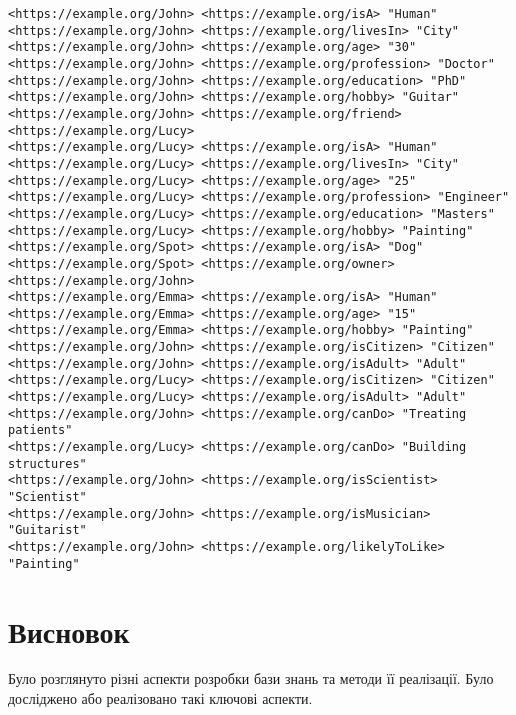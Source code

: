 \documentclass[12pt, a4paper]{article}
\begin{document}
\begin{lstlisting}[breaklines=true]
<https://example.org/John> <https://example.org/isA> "Human"
<https://example.org/John> <https://example.org/livesIn> "City"
<https://example.org/John> <https://example.org/age> "30"
<https://example.org/John> <https://example.org/profession> "Doctor"
<https://example.org/John> <https://example.org/education> "PhD"
<https://example.org/John> <https://example.org/hobby> "Guitar"
<https://example.org/John> <https://example.org/friend> <https://example.org/Lucy>
<https://example.org/Lucy> <https://example.org/isA> "Human"
<https://example.org/Lucy> <https://example.org/livesIn> "City"
<https://example.org/Lucy> <https://example.org/age> "25"
<https://example.org/Lucy> <https://example.org/profession> "Engineer"
<https://example.org/Lucy> <https://example.org/education> "Masters"
<https://example.org/Lucy> <https://example.org/hobby> "Painting"
<https://example.org/Spot> <https://example.org/isA> "Dog"
<https://example.org/Spot> <https://example.org/owner> <https://example.org/John>
<https://example.org/Emma> <https://example.org/isA> "Human"
<https://example.org/Emma> <https://example.org/age> "15"
<https://example.org/Emma> <https://example.org/hobby> "Painting"
<https://example.org/John> <https://example.org/isCitizen> "Citizen"
<https://example.org/John> <https://example.org/isAdult> "Adult"
<https://example.org/Lucy> <https://example.org/isCitizen> "Citizen"
<https://example.org/Lucy> <https://example.org/isAdult> "Adult"
<https://example.org/John> <https://example.org/canDo> "Treating patients"
<https://example.org/Lucy> <https://example.org/canDo> "Building structures"
<https://example.org/John> <https://example.org/isScientist> "Scientist"
<https://example.org/John> <https://example.org/isMusician> "Guitarist"
<https://example.org/John> <https://example.org/likelyToLike> "Painting"
\end{lstlisting}

\section{Висновок}

Було розглянуто різні аспекти розробки бази знань та методи її реалізації. Було досліджено або реалізовано такі ключові аспекти.
\end{document}
